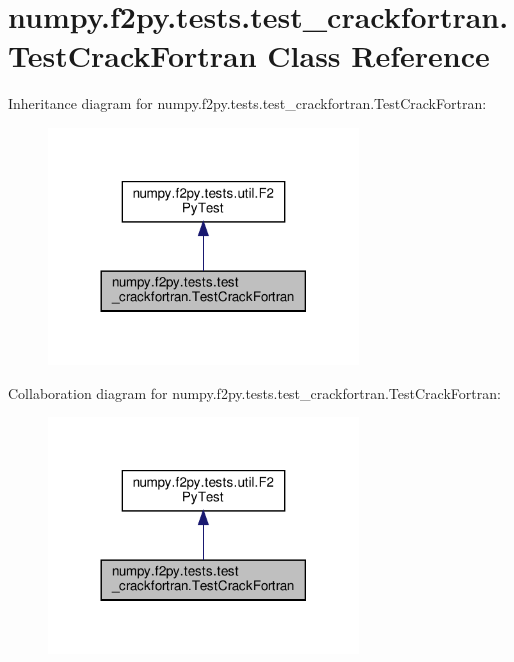 \hypertarget{classnumpy_1_1f2py_1_1tests_1_1test__crackfortran_1_1TestCrackFortran}{}\section{numpy.\+f2py.\+tests.\+test\+\_\+crackfortran.\+Test\+Crack\+Fortran Class Reference}
\label{classnumpy_1_1f2py_1_1tests_1_1test__crackfortran_1_1TestCrackFortran}


Inheritance diagram for numpy.\+f2py.\+tests.\+test\+\_\+crackfortran.\+Test\+Crack\+Fortran\+:
\nopagebreak
\begin{figure}[H]
\begin{center}
\leavevmode
\includegraphics[width=233pt]{classnumpy_1_1f2py_1_1tests_1_1test__crackfortran_1_1TestCrackFortran__inherit__graph}
\end{center}
\end{figure}


Collaboration diagram for numpy.\+f2py.\+tests.\+test\+\_\+crackfortran.\+Test\+Crack\+Fortran\+:
\nopagebreak
\begin{figure}[H]
\begin{center}
\leavevmode
\includegraphics[width=233pt]{classnumpy_1_1f2py_1_1tests_1_1test__crackfortran_1_1TestCrackFortran__coll__graph}
\end{center}
\end{figure}
